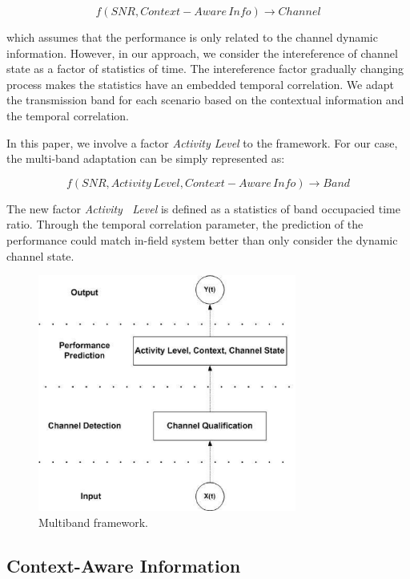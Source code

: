 \begin{equation}
f(SNR,Context-Aware\, Info) \rightarrow Channel
\end{equation}

which assumes that the performance is only related to the channel dynamic information. However, in our approach, we consider the intereference of channel state as a factor of statistics of time. The intereference factor gradually changing process makes the statistics have an embedded temporal correlation. We adapt the transmission band for each scenario based on the contextual information and the temporal correlation. 


In this paper, we involve a factor \emph{Activity Level} to the framework. For our case, the multi-band adaptation can be simply represented as:

\begin{equation}
f(SNR,Activity\, Level,Context-Aware\, Info) \rightarrow Band
\end{equation}

The new factor \emph{Activity \, Level} is defined as a statistics of band occupacied time ratio. Through the temporal correlation parameter, the prediction of the performance could match in-field system better than only consider the dynamic channel state.

\begin{figure}
\centering
\includegraphics[width=85mm]{figure/multiband_framework}
\caption{Multiband framework.}
\label{fig:multiframe}
\end{figure}





\subsection{Context-Aware Information}

